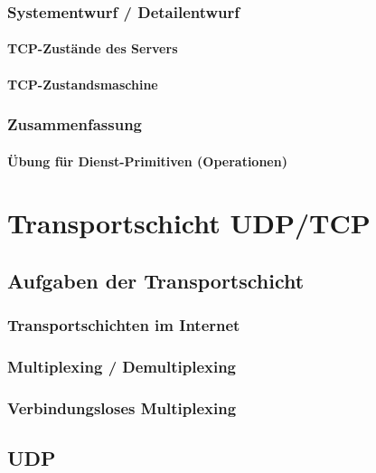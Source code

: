 \subsection{Systementwurf / Detailentwurf}
\subsubsection{TCP-Zustände des Servers}
\subsubsection{TCP-Zustandsmaschine}
\subsection{Zusammenfassung}
\subsubsection{Übung für Dienst-Primitiven (Operationen)}

\chapter{Transportschicht UDP/TCP}
\section{Aufgaben der Transportschicht}
\subsection{Transportschichten im Internet}
\subsection{Multiplexing / Demultiplexing}
\subsection{Verbindungsloses Multiplexing}
\section{UDP}
